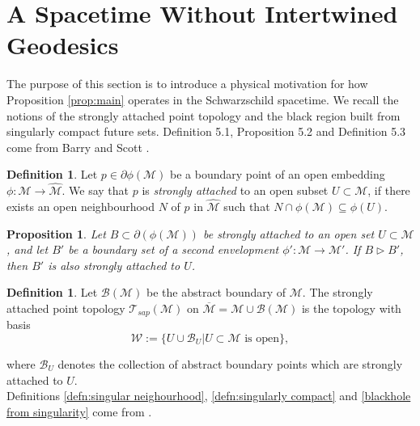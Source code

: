 \documentclass[pdflatex,sn-mathphys-num]{sn-jnl}
\newtheorem{prop}[theorem]{Proposition}
\theoremstyle{definition}
\newtheorem{defn}[theorem]{Definition}
\begin{document}
\section{A Spacetime Without Intertwined Geodesics}\label{section 6}

The purpose of this section is to introduce a physical motivation for how Proposition \ref{prop:main} operates in the Schwarzschild spacetime. We recall the notions of the strongly attached point topology and the black region built from singularly compact future sets. Definition 5.1, Proposition 5.2 and Definition 5.3 come from Barry and Scott \cite{Barry_2014}.
\begin{defn}
    Let $p \in \partial\phi(\mathcal{M})$ be a boundary point of an open embedding $\phi: \mathcal{M} \rightarrow \hat{\mathcal{M}}$. We say that $p$ is \textit{strongly attached} to an open subset $U \subset \mathcal{M}$, if there exists an open neighbourhood $N$ of $p$ in $\hat{\mathcal{M}}$ such that $N \cap \phi(\mathcal{M}) \subseteq \phi(U)$.
\end{defn}

\begin{prop}
    Let $B \subset \partial(\phi(\mathcal{M}))$ be strongly attached to an open set $U \subset \mathcal{M}$, and let $B'$ be a boundary set of a second envelopment $\phi': \mathcal{M} \rightarrow \mathcal{M}'$. If $B \vartriangleright B'$, then $B'$ is also strongly attached to $U$.
\end{prop}

\begin{defn}
    Let $\mathcal{B}(\mathcal{M})$ be the abstract boundary of $\mathcal{M}$. The strongly attached point topology $\mathcal{T}_{sap}(\mathcal{M})$ on $\overline{\mathcal{M}} = \mathcal{M} \cup \mathcal{B}(\mathcal{M})$ is the topology with basis
    \begin{equation}
        \mathcal{W} := \{U \cup \mathcal{B}_{U} | U \subset \mathcal{M}\text{ is open}\},
    \end{equation}
\end{defn}
\noindent where $\mathcal{B}_{U}$ denotes the collection of abstract boundary points which are strongly attached to $U$.\\

Definitions \ref{defn:singular neighourhood}, \ref{defn:singularly compact} and \ref{blackhole from singularity} come from \cite{Wheeler_2023}.
\end{document}
